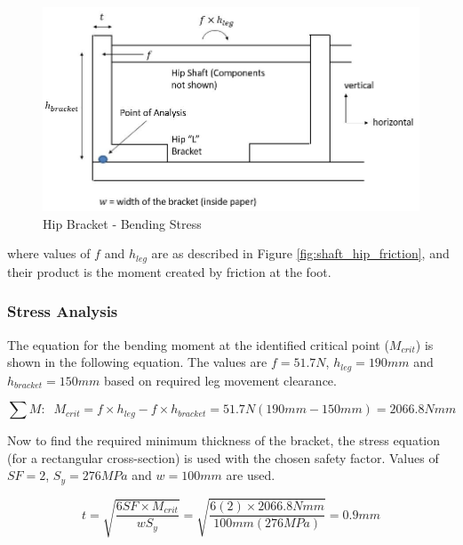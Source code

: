 \begin{figure}
    \centering
    \includegraphics[width=\textwidth]{4_Analysis/img/HipBracket/HipBracket.JPG}
    \caption{Hip Bracket - Bending Stress}
    \label{fig:hipbracket}
\end{figure}

where values of $f$ and $h_{leg}$ are as described in Figure \ref{fig:shaft_hip_friction}, and their product is the moment created by friction at the foot.

\subsubsection{Stress Analysis}

The equation for the bending moment at the identified critical point ($M_{crit}$) is shown in the following equation. The values are $f=51.7N$, $h_{leg}=190 mm$ and $h_{bracket}=150 mm$ based on required leg movement clearance.

\begin{equation}
    \sum M:\;\;M_{crit}=f\times h_{leg} - f\times h_{bracket}=51.7N (190mm-150mm)=2066.8 Nmm
\end{equation}

Now to find the required minimum thickness of the bracket, the stress equation (for a rectangular cross-section) \cite{juvinall_fundamentals_2012} is used with the chosen safety factor. Values of $SF=2$, $S_y=276 MPa$ and $w=100mm$ are used.

\begin{equation}
    t=\sqrt{\frac{6SF\times M_{crit}}{wS_y}}=\sqrt{\frac{6(2)\times 2066.8Nmm}{100mm (276 MPa)}}=0.9 mm
\end{equation}

